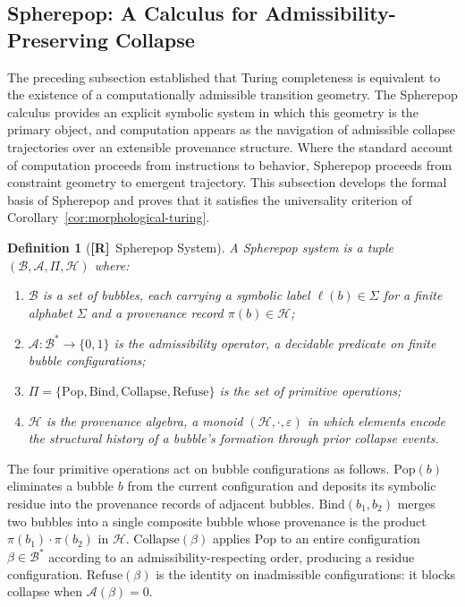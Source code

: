 \documentclass[11pt, oneside]{article}
\numberwithin{equation}{section}
\newcommand{\ClaimR}{\textcolor{rsvpblue}{\textbf{[R]}}}
\theoremstyle{rsvpstyle}
\newtheorem{definition}[theorem]{Definition}
\theoremstyle{remark}
\begin{document}
\subsection{Spherepop: A Calculus for Admissibility-Preserving Collapse}

The preceding subsection established that Turing completeness is equivalent to the
existence of a computationally admissible transition geometry. The Spherepop calculus
provides an explicit symbolic system in which this geometry is the primary object,
and computation appears as the navigation of admissible collapse trajectories over an
extensible provenance structure. Where the standard account of computation proceeds
from instructions to behavior, Spherepop proceeds from constraint geometry to emergent
trajectory. This subsection develops the formal basis of Spherepop and proves that it
satisfies the universality criterion of Corollary~\ref{cor:morphological-turing}.

\begin{definition}[\ClaimR\ Spherepop System]
\label{def:spherepop}
A Spherepop system is a tuple $(\mathcal{B}, \mathcal{A}, \Pi, \mathcal{H})$ where:
\begin{enumerate}[label=(\roman*)]
  \item $\mathcal{B}$ is a set of \emph{bubbles}, each carrying a symbolic label
    $\ell(b) \in \Sigma$ for a finite alphabet $\Sigma$ and a \emph{provenance
    record} $\pi(b) \in \mathcal{H}$;
  \item $\mathcal{A} : \mathcal{B}^* \to \{0,1\}$ is the \emph{admissibility operator},
    a decidable predicate on finite bubble configurations;
  \item $\Pi = \{\mathrm{Pop}, \mathrm{Bind}, \mathrm{Collapse}, \mathrm{Refuse}\}$
    is the set of \emph{primitive operations};
  \item $\mathcal{H}$ is the \emph{provenance algebra}, a monoid $(\mathcal{H},
    \cdot, \varepsilon)$ in which elements encode the structural history of a bubble's
    formation through prior collapse events.
\end{enumerate}
\end{definition}

The four primitive operations act on bubble configurations as follows. $\mathrm{Pop}(b)$
eliminates a bubble $b$ from the current configuration and deposits its symbolic
residue into the provenance records of adjacent bubbles. $\mathrm{Bind}(b_1, b_2)$
merges two bubbles into a single composite bubble whose provenance is the product
$\pi(b_1) \cdot \pi(b_2)$ in $\mathcal{H}$. $\mathrm{Collapse}(\beta)$ applies
$\mathrm{Pop}$ to an entire configuration $\beta \in \mathcal{B}^*$ according to
an admissibility-respecting order, producing a residue configuration. $\mathrm{Refuse}(\beta)$
is the identity on inadmissible configurations: it blocks collapse when $\mathcal{A}(\beta) = 0$.
\end{document}
